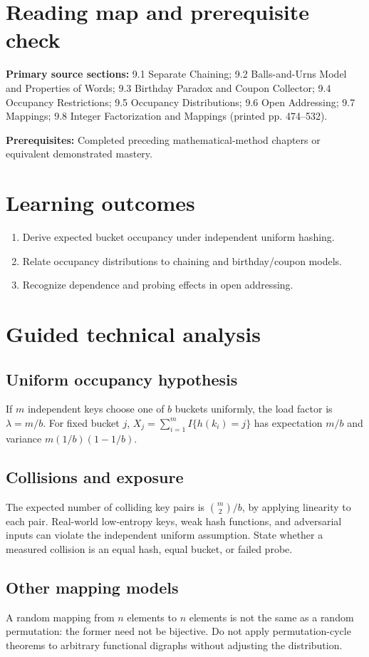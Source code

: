 \documentclass[11pt]{article}
\begin{document}
\makedoctocpage
\section{Reading map and prerequisite check}
\noindent\textbf{Primary source sections:} 9.1 Separate Chaining; 9.2 Balls-and-Urns Model and Properties of Words; 9.3 Birthday Paradox and Coupon Collector; 9.4 Occupancy Restrictions; 9.5 Occupancy Distributions; 9.6 Open Addressing; 9.7 Mappings; 9.8 Integer Factorization and Mappings (printed pp. 474--532).\par
\noindent\textbf{Prerequisites:} Completed preceding mathematical-method chapters or equivalent demonstrated mastery.\par
\section{Learning outcomes}
\begin{enumerate}
\item Derive expected bucket occupancy under independent uniform hashing.
\item Relate occupancy distributions to chaining and birthday/coupon models.
\item Recognize dependence and probing effects in open addressing.
\end{enumerate}
\section{Guided technical analysis}
\subsection{Uniform occupancy hypothesis}
If $m$ independent keys choose one of $b$ buckets uniformly, the load factor is $\lambda=m/b$. For fixed bucket $j$, $X_j=\sum_{i=1}^m I\{h(k_i)=j\}$ has expectation $m/b$ and variance $m(1/b)(1-1/b)$.
\subsection{Collisions and exposure}
The expected number of colliding key pairs is $\binom m2/b$, by applying linearity to each pair. Real-world low-entropy keys, weak hash functions, and adversarial inputs can violate the independent uniform assumption. State whether a measured collision is an equal hash, equal bucket, or failed probe.
\subsection{Other mapping models}
A random mapping from $n$ elements to $n$ elements is not the same as a random permutation: the former need not be bijective. Do not apply permutation-cycle theorems to arbitrary functional digraphs without adjusting the distribution.
\end{document}
